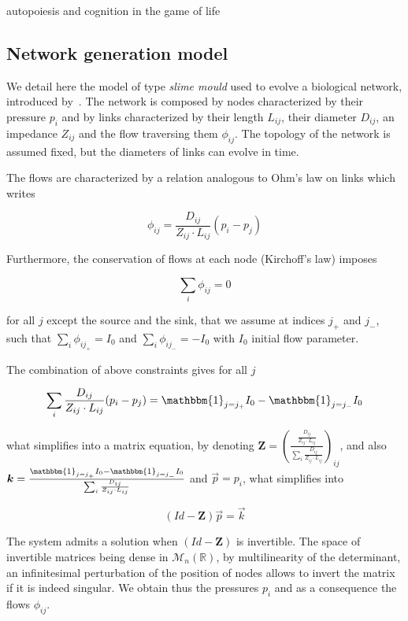 \documentclass[runningheads,a4paper]{llncs2e/llncs}
\begin{document}
\cite{langton1986studying}

\cite{beer2004autopoiesis} autopoiesis and cognition in the game of life


\subsection{Network generation model}


We detail here the model of type \emph{slime mould} used to evolve a biological network, introduced by~\cite{tero2007mathematical}. The network is composed by nodes characterized by their pressure $p_i$ and by links characterized by their length $L_{ij}$, their diameter $D_{ij}$, an impedance $Z_{ij}$ and the flow traversing them $\phi_{ij}$. The topology of the network is assumed fixed, but the diameters of links can evolve in time.


The flows are characterized by a relation analogous to Ohm's law on links which writes

\[
\phi_{ij} = \frac{D_{ij}}{Z_{ij}\cdot L_{ij}} \left(p_i - p_j\right)
\]

Furthermore, the conservation of flows at each node (Kirchoff's law) imposes

\[
\sum_i \phi_{ij} = 0
\]

for all $j$ except the source and the sink, that we assume at indices $j_+$ and $j_-$, such that $\sum_i \phi_{ij_+} = I_0$ and $\sum_i \phi_{ij_-} = -I_0$ with $I_0$ initial flow parameter.

The combination of above constraints gives for all $j$

\[
\sum_i \frac{D_{ij}}{Z_{ij}\cdot L_{ij}} (p_i - p_j) = \mathbbm{1}_{j=j_+} I_0 - \mathbbm{1}_{j=j_-} I_0 
\]

what simplifies into a matrix equation, by denoting $\mathbf{Z} = \left(\frac{\frac{D_{ij}}{Z_{ij}\cdot L_{ij}}}{\sum_i \frac{D_{ij}}{Z_{ij}\cdot L_{ij}}}\right)_{ij}$, and also $\vec{k} = \frac{\mathbbm{1}_{j=j_+} I_0 - \mathbbm{1}_{j=j_-} I_0 }{\sum_i \frac{D_{ij}}{Z_{ij}\cdot L_{ij}}}$ and $\vec{p} = p_i$, what simplifies into

\[
\left(Id - \mathbf{Z}\right) \vec{p} = \vec{k}
\]

The system admits a solution when $\left(Id - \mathbf{Z}\right)$ is invertible. The space of invertible matrices being dense in $\mathcal{M}_n(\mathbb{R})$, by multilinearity of the determinant, an infinitesimal perturbation of the position of nodes allows to invert the matrix if it is indeed singular. We obtain thus the pressures $p_i$ and as a consequence the flows $\phi_{ij}$.
\end{document}
